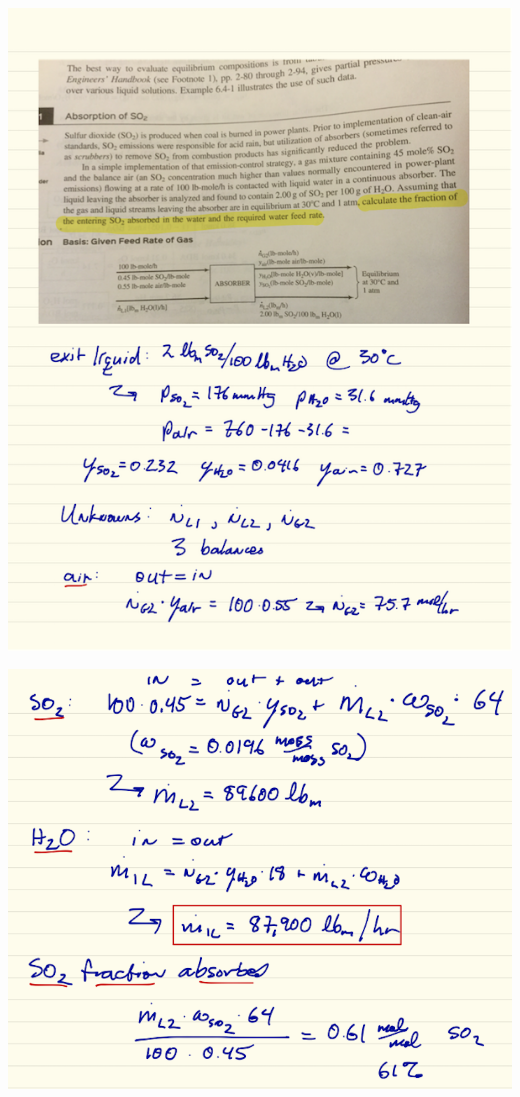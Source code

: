 \documentclass[11pt]{article}
\begin{document}
\includegraphics[width=1.0\textwidth]{./figs/VLE1.png}

\includegraphics[width=1.0\textwidth]{./figs/VLE2.png}
\end{document}
